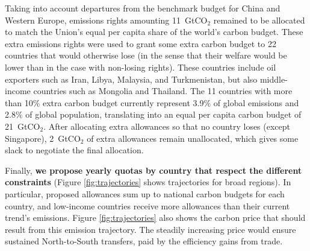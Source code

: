 \documentclass[12pt,english]{article}
\begin{document}
Taking into account departures from the benchmark budget for China and Western Europe, emissions rights amounting 11~GtCO$_\text{2}$ remained to be allocated to match the Union's equal per capita share of the world's carbon budget. %
These extra emissions rights were 
used to grant some extra carbon budget to 22 countries that would otherwise lose (in the sense that their welfare would be lower than in the case with non-losing rights). 
These countries include oil exporters such as %
Iran, Libya, Malaysia, and Turkmenistan, but also middle-income countries such as Mongolia and Thailand. %
The 11 countries with more than 10\% extra carbon budget currently represent 3.9\% %
of global emissions and 2.8\% %
of global population, translating into an equal per capita carbon budget of 21~GtCO$_\text{2}$. %
After allocating extra allowances so that no country loses (except Singapore), 2~GtCO$_\text{2}$ of extra allowances remain unallocated, which gives some slack to negotiate the final allocation. 

Finally, \textbf{we propose yearly quotas by country that respect the different constraints} (Figure \ref{fig:trajectories} shows trajectories for broad regions). 
In particular, proposed allowances sum up to national carbon budgets for each country, and low-income countries receive more allowances than their current trend's emissions. %
Figure \ref{fig:trajectories} also shows the carbon price that should result from this emission trajectory. The steadily increasing price would ensure sustained North-to-South transfers, paid by the efficiency gains from trade.
\end{document}
